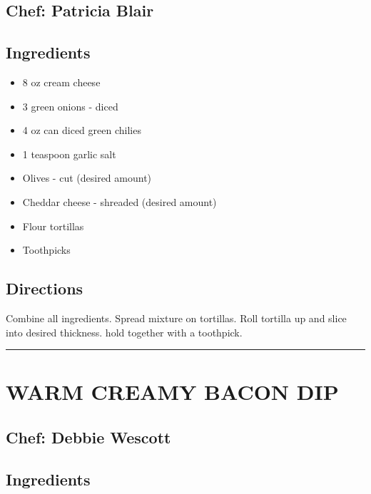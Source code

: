 \documentclass[
]{book}
\providecommand{\tightlist}{%
  \setlength{\itemsep}{0pt}\setlength{\parskip}{0pt}}
\begin{document}
\hypertarget{chef-patricia-blair-3}{%
\subsection*{Chef: Patricia Blair}\label{chef-patricia-blair-3}}


\hypertarget{ingredients-10}{%
\subsection*{Ingredients}\label{ingredients-10}}


\begin{itemize}
\tightlist
\item
  8 oz cream cheese
\item
  3 green onions - diced
\item
  4 oz can diced green chilies
\item
  1 teaspoon garlic salt
\item
  Olives - cut (desired amount)
\item
  Cheddar cheese - shreaded (desired amount)
\item
  Flour tortillas
\item
  Toothpicks
\end{itemize}

\hypertarget{directions-10}{%
\subsection*{Directions}\label{directions-10}}


Combine all ingredients. Spread mixture on tortillas. Roll tortilla up and slice into desired thickness.
hold together with a toothpick.

\begin{center}\rule{0.5\linewidth}{0.5pt}\end{center}

\hypertarget{warm-creamy-bacon-dip}{%
\section*{WARM CREAMY BACON DIP}\label{warm-creamy-bacon-dip}}


\hypertarget{chef-debbie-wescott-1}{%
\subsection*{Chef: Debbie Wescott}\label{chef-debbie-wescott-1}}


\hypertarget{ingredients-11}{%
\subsection*{Ingredients}\label{ingredients-11}}
\end{document}
